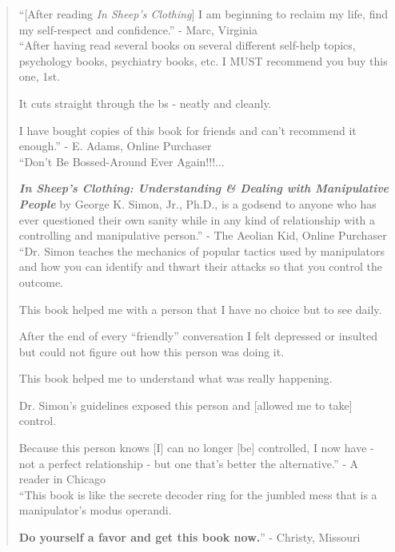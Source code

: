 \documentclass[oneside]{book}
\numberwithin{equation}{section}
\begin{document}
\begin{quotation}
    ``[After reading \textit{In Sheep's Clothing}] I am beginning to reclaim my life, find my self-respect and confidence.'' - Marc, Virginia\\
    
    ``After having read several books on several different self-help topics, psychology books, psychiatry books, etc. I MUST recommend you buy this one, 1st.
    
    It cuts straight through the bs - neatly and cleanly.
    
    I have bought copies of this book for friends and can't recommend it enough.'' - E. Adams, Online Purchaser\\
    
    ``Don't Be Bossed-Around Ever Again!!!$\ldots$
    
    \textbf{\textit{In Sheep's Clothing: Understanding \& Dealing with Manipulative People}} by George K. Simon, Jr., Ph.D., is a godsend to anyone who has ever questioned their own sanity while in any kind of relationship with a controlling and manipulative person.'' - The Aeolian Kid, Online Purchaser\\
    
    ``Dr. Simon teaches the mechanics of popular tactics used by manipulators and how you can identify and thwart their attacks so that you control the outcome.
    
    This book helped me with a person that I have no choice but to see daily.
    
    After the end of every ``friendly'' conversation I felt depressed or insulted but could not figure out how this person was doing it.
    
    This book helped me to understand what was really happening.
    
    Dr. Simon's guidelines exposed this person and [allowed me to take] control.
    
    Because this person knows [I] can no longer [be] controlled, I now have - not a perfect relationship - but one that's better the alternative.'' - A reader in Chicago\\
    
    ``This book is like the secrete decoder ring for the jumbled mess that is a manipulator's modus operandi.
    
    \textbf{Do yourself a favor and get this book now.}'' - Christy, Missouri\\
    

\end{quotation}
\end{document}
